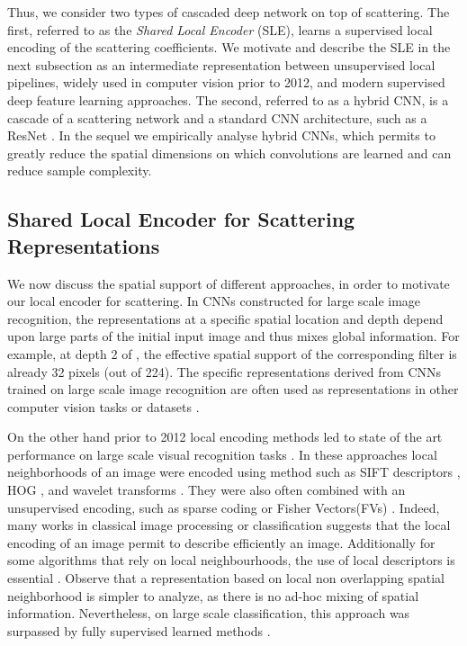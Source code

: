 \documentclass[10pt,twocolumn,letterpaper]{article}
\begin{document}
Thus, we consider two types of cascaded deep network on top of scattering. The first, referred to as the \textit{Shared Local Encoder} (SLE), learns a supervised local encoding of the scattering coefficients. We motivate and describe the SLE in the next subsection as an intermediate representation between unsupervised local pipelines, widely used in computer vision prior to 2012, and modern supervised deep feature learning approaches. 
The second, referred to as a hybrid CNN, is a cascade of a scattering network and a standard CNN architecture, such as a ResNet \cite{he2015deep}. In the sequel we empirically analyse hybrid CNNs, which permits to greatly reduce the spatial dimensions on which convolutions are learned and can reduce sample complexity.   
  



 
\subsection{Shared Local Encoder for Scattering Representations}
\label{supervised_encoding}






We now discuss the spatial support of different approaches, in order to motivate our local encoder for scattering. In CNNs constructed for large scale image recognition, the representations at a specific spatial location and depth depend upon large parts of the initial input image and thus mixes global  information. For example, at  depth 2 of \cite{krizhevsky2012imagenet}, the effective spatial support of the corresponding filter is already 32 pixels (out of 224). The specific representations derived from CNNs trained on large scale image recognition are often used as representations in other computer vision tasks or datasets \cite{yosinski2014transferable,zeiler2014visualizing}. 

On the other hand prior to  2012 local encoding methods led to state of the art performance on large scale visual recognition tasks \cite{sanchez2011high}. In these approaches local neighborhoods of an image were encoded using method such as SIFT descriptors \cite{lowe1999object}, HOG \cite{dalal2005histograms}, and wavelet transforms \cite{serre2004realistic}. They were also often combined with an unsupervised encoding, such as sparse coding \cite{boureau2011ask} or Fisher Vectors(FVs) \cite{sanchez2011high}. Indeed, many works in classical image processing or  classification \cite{koenderink1999structure,boureau2011ask,sanchez2011high,perronnin2015fisher} suggests that the local encoding of an image permit to describe efficiently an image. Additionally for some algorithms that rely on local neighbourhoods, the use of local descriptors is essential \cite{lowe1999object}. Observe that a representation based on local non overlapping spatial neighborhood is simpler to analyze, as there is no ad-hoc mixing of spatial information. Nevertheless, on large scale classification, this approach was surpassed by fully supervised learned methods \cite{krizhevsky2012imagenet}.
\end{document}

